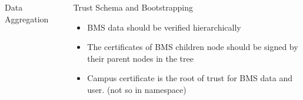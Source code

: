 \documentclass[final,hyperref={pdfpagelabels=false},20pt]{beamer}
\begin{document}
\begin{frame}[t]
\begin{columns}[t]
\begin{column}{.465\textwidth}
\begin{block}{Data Aggregation}
\begin{columns}[T]
\end{columns}

\end{block}

\end{column} %

\begin{column}{.02\textwidth}\end{column} %
 
\begin{column}{.465\textwidth} %


\begin{block}{Trust Schema and Bootstrapping}

\begin{itemize}
\item{BMS data should be verified hierarchically}
\item{The certificates of BMS children node should be signed by their parent nodes in the tree}
\item{Campus certificate is the root of trust for BMS data and user. (not so in namespace)}
\end{itemize}

\begin{columns}[T]

\begin{column}{.25\textwidth}


\end{column}
\end{columns}
\end{block}
\end{column}
\end{columns}
\end{frame}
\end{document}
